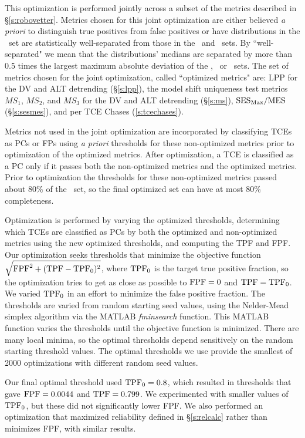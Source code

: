 This optimization is performed jointly across a subset of the metrics described in \S\ref{s:robovetter}.  Metrics chosen for this joint optimization are either believed {\it a priori} to distinguish true positives from false positives or have distributions in the \injtce\ set are statistically well-separated from those in the \scrtce\ and \invtce\ sets.  By ``well-separated" we mean that the distributions' medians are separated by more than 0.5 times the largest maximum absolute deviation of the \injtce, \scrtce\ or \invtce\ sets.  The set of metrics chosen for the joint optimization, called ``optimized metrics" are: LPP for the DV and ALT detrending (\S\ref{s:lpp}), the model shift uniqueness test metrics $MS_{1}$, $MS_{2}$, and $MS_{3}$ for the DV and ALT detrending (\S\ref{s:ms}), ${{\rm SES}_{\rm Max} / {\rm MES}}$ (\S\ref{s:sesmes}), and per TCE Chases (\s\ref{s:tcechases}). 

Metrics not used in the joint optimization are incorporated by classifying TCEs as PCs or FPs using {\it a priori} thresholds for these non-optimized metrics prior to optimization of the optimized metrics.  After optimization, a TCE is classified as a PC only if it passes both the non-optimized metrics and the optimized metrics.  Prior to optimization the thresholds for these non-optimized metrics passed about 80\% of the  \injtce\ set, so the final optimized set can have at most 80\% completeness.  

Optimization is performed by varying the optimized thresholds, determining which TCEs are classified as PCs by both the optimized and non-optimized metrics using the new optimized thresholds, and computing the TPF and FPF.  Our optimization seeks thresholds that minimize the objective function $\sqrt{{\rm FPF}^2 + ({\rm TPF} - {\rm TPF}_0)^2}$, where ${\rm TPF}_0$ is the target true positive fraction, so the optimization tries to get as close as possible to ${\rm FPF} = 0$ and ${\rm TPF} = {\rm TPF}_0$.  We varied ${\rm TPF}_0$ in an effort to minimize the false positive fraction. The thresholds are varied from random starting seed values, using the Nelder-Mead simplex algorithm via the \textsc{MATLAB} {\it fminsearch} function.  This \textsc{MATLAB} function varies the thresholds until the objective function is minimized.  There are many local minima, so the optimal thresholds depend sensitively on the random starting threshold values.  The optimal thresholds we use provide the smallest of 2000 optimizations with different random seed values.

Our final optimal threshold used ${\rm TPF}_0 = 0.8$, which resulted in thresholds that gave ${\rm FPF} = 0.0044$ and ${\rm TPF} = 0.799$.  We experimented with smaller values of ${\rm TPF}_0$, but these did not significantly lower FPF.   We also performed an optimization that maximized reliability defined in \S\ref{s:relcalc} rather than minimizes FPF, with similar results.  

